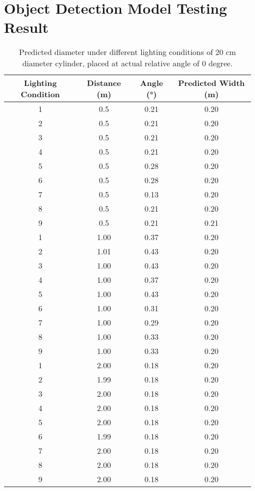 \appendix
\chapter{Object Detection Model Testing Result}

\begin{table}[t]
    \centering
    \caption{Predicted diameter under different lighting conditions of 20 cm diameter cylinder, placed at actual relative angle of 0 degree.}
    \label{tab:20cm}
    \begin{tabular}{cccc}
    \toprule
    \textbf{Lighting Condition} & \textbf{Distance (m)} & \textbf{Angle (°)} & \textbf{Predicted Width (m)} \\
    \midrule
    1 & 0.5 & 0.21 & 0.20 \\
    2 & 0.5 & 0.21 & 0.20 \\
    3 & 0.5 & 0.21 & 0.20 \\
    4 & 0.5 & 0.21 & 0.20 \\
    5 & 0.5 & 0.28 & 0.20 \\
    6 & 0.5 & 0.28 & 0.20 \\
    7 & 0.5 & 0.13 & 0.20 \\
    8 & 0.5 & 0.21 & 0.20 \\
    9 & 0.5 & 0.21 & 0.21 \\
    \cmidrule(lr){1-4}
    1 & 1.00 & 0.37 & 0.20 \\
    2 & 1.01 & 0.43 & 0.20 \\
    3 & 1.00 & 0.43 & 0.20 \\
    4 & 1.00 & 0.37 & 0.20 \\
    5 & 1.00 & 0.43 & 0.20 \\
    6 & 1.00 & 0.31 & 0.20 \\
    7 & 1.00 & 0.29 & 0.20 \\
    8 & 1.00 & 0.33 & 0.20 \\
    9 & 1.00 & 0.33 & 0.20 \\
    \cmidrule(lr){1-4}
    1 & 2.00 & 0.18 & 0.20 \\
    2 & 1.99 & 0.18 & 0.20 \\
    3 & 2.00 & 0.18 & 0.20 \\
    4 & 2.00 & 0.18 & 0.20 \\
    5 & 2.00 & 0.18 & 0.20 \\
    6 & 1.99 & 0.18 & 0.20 \\
    7 & 2.00 & 0.18 & 0.20 \\
    8 & 2.00 & 0.18 & 0.20 \\
    9 & 2.00 & 0.18 & 0.20 \\

\end{tabular}
\end{table}
